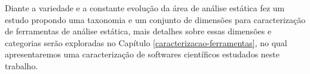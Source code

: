 Diante a variedade e a constante evolução da área de análise estática
 fez um estudo propondo uma taxonomia e um conjunto de
dimensões para caracterização de ferramentas de análise estática, mais detalhes
sobre essas dimensões e categorias serão exploradas no Capítulo
\ref{caracterizacao-ferramentas}, no qual apresentaremos uma caracterização de
softwares científicos estudados neste trabalho.

